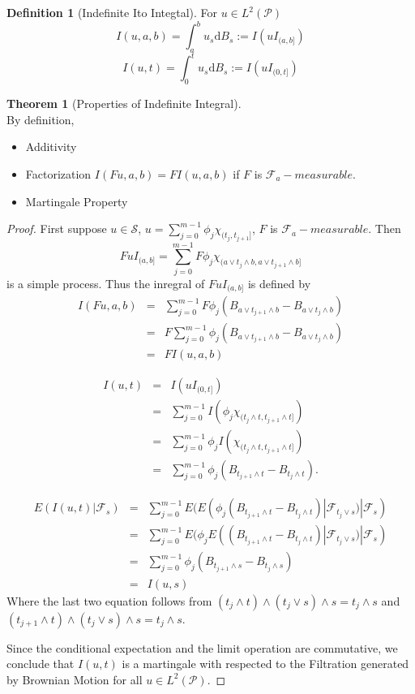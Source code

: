 \documentclass[12pt]{book}
\theoremstyle{definition}
\newtheorem{definition}{Definition}[chapter]
\newtheorem{theorem}{Theorem}[chapter]
\newcommand{\D}{\mathrm{d}}
\begin{document}
\begin{definition}[Indefinite Ito Integtal]
For $u \in L^2(\mathcal P)$
$$
I(u,a,b) = \int_a^b u_s \D B_s := I(uI_{(a,b]})
$$
$$
I(u,t) = \int_0^t u_s \D B_s := I(uI_{(0,t]})
$$

\end{definition}
\begin{theorem}[Properties of Indefinite Integral]\label{Indef_prop} \ \\
By definition, 
\begin{itemize}
	\item Additivity
	\item Factorization $I(Fu,a,b)=FI(u,a,b)$ if $F$ is $\mathcal{F}_a-measurable$.
	\item Martingale Property
\end{itemize}
\begin{proof}
First suppose $u \in \mathcal{S}$, $u = \sum_{j=0}^{m-1}\phi_j \chi_{(t_j,t_{j+1}]}$, $F$ is $\mathcal{F}_a-measurable$. Then 
$$
FuI_{(a,b]} = \sum_{j=0}^{m-1}F\phi_j \chi_{(a\vee t_j \wedge b, a \vee t_{j+1} \wedge b]}
$$
is a simple process. Thus the inregral of $FuI_{(a,b]}$ is defined by
\begin{eqnarray*}
	I(Fu,a,b) &=& \sum_{j=0}^{m-1}F\phi_j(B_{a\vee t_{j+1} \wedge b}-B_{a\vee t_j \wedge b}) \\
	&=& F\sum_{j=0}^{m-1}\phi_j(B_{a\vee t_{j+1} \wedge b}-B_{a\vee t_j \wedge b}) \\
	&=& FI(u,a,b) 
\end{eqnarray*}

\begin{eqnarray*}
	I(u,t) &=& I(uI_{(0,t]}) \\
	&=&  \sum_{j=0}^{m-1}I(\phi_j \chi_{(t_j \wedge t,t_{j+1} \wedge t]}) \\
	&=& \sum_{j=0}^{m-1}\phi_jI(\chi_{(t_j \wedge t,t_{j+1} \wedge t]}) \\
	&=& \sum_{j=0}^{m-1}\phi_j(B_{t_{j+1} \wedge t}-B_{t_j \wedge t}).
\end{eqnarray*}

\begin{eqnarray*}
	E(I(u,t)|\mathcal{F}_s) &=& \sum_{j=0}^{m-1} E(E(\phi_j(B_{t_{j+1} \wedge t}-B_{t_j \wedge t})|\mathcal{F}_{t_j \vee s})|\mathcal{F}_s) \\
	&=& \sum_{j=0}^{m-1} E(\phi_jE((B_{t_{j+1} \wedge t}-B_{t_j \wedge t})|\mathcal{F}_{t_j \vee s})|\mathcal{F}_s) \\
	&=& \sum_{j=0}^{m-1}\phi_j(B_{t_{j+1}\wedge s}-B_{t_{j}\wedge s}) \\
	&=& I(u,s)
\end{eqnarray*}
Where the last two equation follows from $(t_j \wedge t)\wedge (t_j \vee s) \wedge s=t_j \wedge s$ and $(t_{j+1} \wedge t)\wedge (t_j \vee s) \wedge s=t_j \wedge s$.

Since the conditional expectation and the limit operation are commutative, we conclude that $I(u,t)$ is a martingale with respected to the Filtration generated by Brownian Motion for all $u \in L^2(\mathcal P)$.
\end{proof}
\end{theorem}
\end{document}
